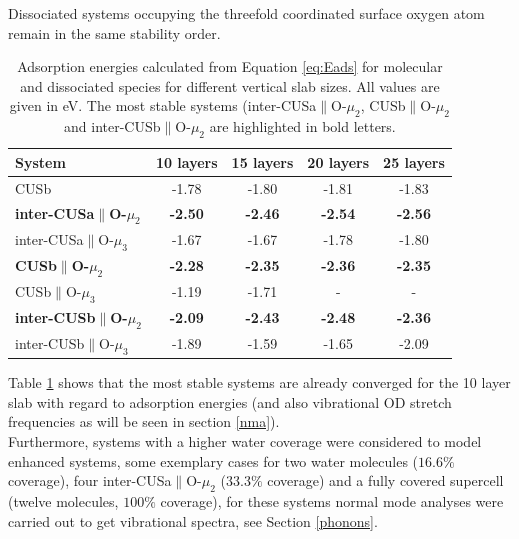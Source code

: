 \documentclass[11pt,DIV=13,BCOR=5mm,a4paper,headinclude]{scrbook}
\begin{document}
Dissociated systems occupying the threefold coordinated surface oxygen atom remain in the same stability order.
\begin{table}[!ht]
  \centering
  \caption{Adsorption energies calculated from Equation \ref{eq:Eads} for molecular and dissociated species for different vertical slab sizes.
All values are given in eV.
The most stable systems (inter-CUSa$\parallel$O-$\mu_2$, CUSb$\parallel$O-$\mu_2$ and inter-CUSb$\parallel$O-$\mu_2$ are highlighted in bold letters.}
 \begin{tabular}{l|cccc}
 \toprule
 System                     & 10 layers& 15 layers& 20 layers&  25 layers \\\midrule
CUSb                                    &-1.78 &-1.80     &-1.81     &-1.83      \\\hline
\textbf{inter-CUSa$\parallel$O-$\mu_2$}    &\textbf{-2.50} &\textbf{-2.46} &\textbf{-2.54} &\textbf{-2.56}  \\
inter-CUSa$\parallel$O-$\mu_3$          &-1.67 &-1.67 &-1.78 &-1.80 \\
\textbf{CUSb$\parallel$O-$\mu_2$}          &\textbf{-2.28} &\textbf{-2.35} &\textbf{-2.36} &\textbf{-2.35} \\
CUSb$\parallel$O-$\mu_3$                &-1.19 &-1.71 &-     &-      \\
\textbf{inter-CUSb$\parallel$O-$\mu_2$}    &\textbf{-2.09} &\textbf{-2.43} &\textbf{-2.48} &\textbf{-2.36}  \\
inter-CUSb$\parallel$O-$\mu_3$          &-1.89 &-1.59 &-1.65 &-2.09 \\\bottomrule
\end{tabular}
\label{tab:eads_layers}
\end{table}
Table \ref{tab:eads_layers} shows that the most stable systems are already converged for the 10 layer slab with regard to adsorption energies (and also vibrational OD stretch frequencies as will be seen in section \ref{nma}).
\\
Furthermore, systems with a higher water coverage were considered to model enhanced systems, some exemplary cases for two water molecules ($16.6\%$ coverage), four inter-CUSa$\parallel$O-$\mu_2$ ($33.3\%$ coverage) and a fully covered supercell (twelve molecules, $100\%$ coverage), for these systems normal mode analyses were carried out to get vibrational spectra, see Section \ref{phonons}.
\end{document}
